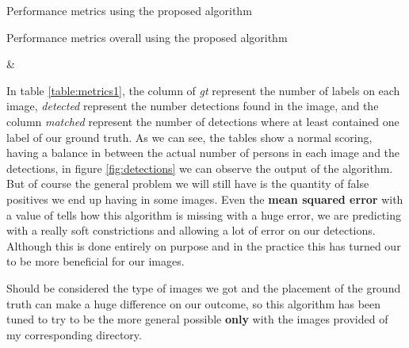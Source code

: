 \documentclass[11pt]{article}
\begin{document}
\begin{table} [hp]
  \centering
  \caption[Performance metrics Basic]{Performance metrics using the proposed algorithm}\label{table:metrics1}
\end{table}

\begin{table} [hp]
  \centering
  \caption[Performance metrics overall]{Performance metrics overall using the proposed algorithm}\label{table:metrics_2}

  {\csvcoli & \csvcolii}%
\end{table}

In table \ref{table:metrics1}, the column of \textit{gt} represent the number of labels on each image, \textit{detected} represent the number detections found in the image, and the column \textit{matched} represent the number of detections where at least contained one label of our ground truth. As we can see, the tables show a normal scoring, having a balance in between the actual number of persons in each image and the detections, in figure \ref*{fig:detections} we can observe the output of the algorithm. But of course the general problem we will still have is the quantity of false positives we end up having in some images. Even the \textbf{mean squared error} with a value of  tells how this algorithm is missing with a huge error, we are predicting with a really soft constrictions and allowing a lot of error on our detections. Although this is done entirely on purpose and in the practice this has turned our to be more beneficial for our images.\newline

Should be considered the type of images we got and the placement of the ground truth can make a huge difference on our outcome, so this algorithm has been tuned to try to be the more general possible \textbf{only} with the images provided of my corresponding directory.
\end{document}
